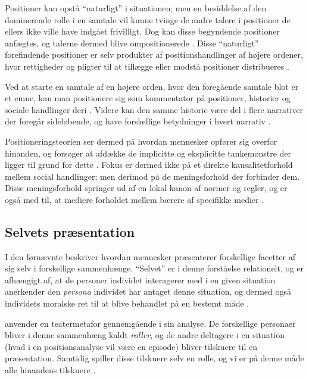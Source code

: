 

Positioner kan opstå “naturligt” i situationen; men en besiddelse 
af den dominerende rolle i en samtale vil kunne tvinge de andre 
talere i positioner de ellers ikke ville have indgået frivilligt. 
Dog kan disse begyndende positioner anfægtes, og talerne dermed 
blive ompositionerede \autocite[s. 
18]{harrePositioningTheoryMoral1999}. Disse “naturligt” 
forefindende positioner er selv produkter af  positionshandlinger
af højere ordener, hvor rettigheder og  pligter til at tillægge
eller modstå positioner distribueres  \autocite[s.  
8]{harreRecentAdvancesPositioning2009}.

Ved at starte en samtale af en højere orden, hvor den foregående 
samtale blot er et emne, kan man positionere sig som kommentator 
på positioner, historier og sociale handlinger deri \autocite[s.  
18]{harrePositioningTheoryMoral1999}. Videre kan den samme 
historie være del i flere narrativer der foregår sideløbende, og
have forskellige  betydninger i hvert narrativ 
\autocite{harreRecentAdvancesPositioning2009}.

Positioneringsteorien ser dermed på hvordan mennesker opfører sig 
overfor hinanden, og forsøger at afdække de implicitte og 
eksplicitte tankemønstre der ligger til grund for dette 
\autocite[s. 5]{harreRecentAdvancesPositioning2009}.
Fokus er dermed ikke på et direkte kausalitetforhold mellem social 
handlinger; men derimod på de meningsforhold der forbinder dem.  
Disse meningsforhold springer ud af en lokal kanon af normer og 
regler, og er også med til, at mediere forholdet mellem bærere af 
specifikke medier \autocite[s. 
7]{harreRecentAdvancesPositioning2009}.

\subsection{Selvets præsentation}

I den førnævnte  
beskriver \citeauthor{goffmanPresentationSelfEveryday1956} hvordan 
mennesker præsenterer forskellige facetter af sig selv i 
forskellige sammenhænge. “Selvet” er i denne forståelse 
relationelt, og er afhængigt af, at de personer individet 
interagerer med i en given situation anerkender den \emph{persona} 
individet har antaget denne situation, og dermed også individets 
moralske ret til at blive behandlet på en bestemt måde 
\autocite[s.  6-7]{goffmanPresentationSelfEveryday1956}.

\citeauthor{goffmanPresentationSelfEveryday1956} anvender en 
teatermetafor gennemgående i sin analyse. De forskellige personaer 
bliver i denne sammenhæng kaldt \emph{roller}, og de andre 
deltagere i en situation (hvad i en positionsanalyse vil være en 
episode) bliver tilskuere til en præsentation. Samtidig spiller 
disse tilskuere selv en rolle, og vi er på denne måde alle 
hinandens tilskuere 
\autocite[forordet]{goffmanPresentationSelfEveryday1956}.

